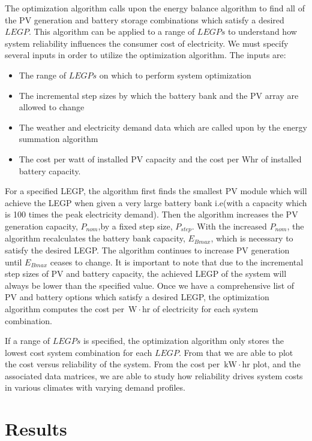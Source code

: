 \documentclass{article}
\newcommand{\unit}[1]{\ensuremath{\, \mathrm{#1}}}
\begin{document}
The optimization algorithm calls upon the energy balance algorithm to find all of the PV generation and battery storage combinations which satisfy a desired $LEGP$. This algorithm can be applied to a range of $LEGPs$ to understand how system reliability influences the consumer cost of electricity. We must specify several inputs in order to utilize the optimization algorithm. The inputs are:

\begin{itemize}
\item The range of $LEGPs$ on which to perform system optimization
\item The incremental step sizes by which the battery bank and the PV array are allowed to change
\item The weather and electricity demand data which are called upon by the energy summation algorithm
\item The cost per watt of installed PV capacity and the cost per Whr of installed battery capacity. 
\end{itemize}

For a specified LEGP, the algorithm first finds the smallest PV module which will achieve the LEGP when given a very large battery bank i.e(with a capacity which is 100 times the peak electricity demand). 
Then the algorithm increases the PV generation capacity, $P_{nom}$,by a fixed step size, $P_{step}$.
With the increased $P_{nom}$, the algorithm recalculates the battery bank capacity, $E_{Bmax}$, which is necessary to satisfy the desired LEGP.
The algorithm continues to increase PV generation until $E_{Bmax}$ ceases to change. 
It is important to note that due to the incremental step sizes of PV and battery capacity, the achieved LEGP of the system will always be lower than the specified value. 
Once we have a comprehensive list of PV and battery options which satisfy a desired LEGP, the optimization algorithm computes the cost per \unit{W\cdot hr} of electricity for each system combination.

If a range of $LEGPs$ is specified, the optimization algorithm only stores the lowest cost system combination for each $LEGP$. 
From that we are able to plot the cost versus reliability of the system. 
From the cost per \unit{kW\cdot hr} plot, and the associated data matrices, we are able to study how reliability drives system costs in various climates with varying demand profiles. 

\section{Results}
\end{document}
